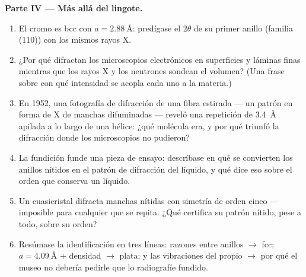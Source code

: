 \begin{problem}
\medskip\noindent\textbf{Parte IV --- Más allá del lingote.}

\begin{enumerate}[resume]
  \item El cromo es bcc con $a = \qty{2.88}{\angstrom}$: predígase
        el $2\theta$ de su primer anillo (familia (110)) con los
        mismos rayos X.
  \item ¿Por qué difractan los microscopios electrónicos en superficies y
        láminas finas mientras que los rayos X y los neutrones sondean el volumen? (Una
        frase sobre con qué intensidad se acopla cada uno a la materia.)
  \item En 1952, una fotografía de difracción de una fibra estirada --- un
        patrón en forma de X de manchas difuminadas --- reveló una repetición de
        \qty{3.4}{\angstrom} apilada a lo largo de una hélice: ¿qué molécula
        era, y por qué triunfó la difracción donde los microscopios no
        pudieron?
  \item La fundición funde una pieza de ensayo: descríbase en qué se convierten los
        anillos nítidos en el patrón de difracción del líquido, y qué
        dice eso sobre el orden que conserva un líquido.
  \item Un cuasicristal difracta manchas nítidas con simetría de orden
        cinco --- imposible para cualquier  que se repita. ¿Qué
        certifica su patrón nítido, pese a todo, sobre su orden?
  \item Resúmase la identificación en tres líneas: razones entre anillos
        $\to$ fcc; $a = \qty{4.09}{\angstrom}$ $+$ densidad $\to$
        plata; y las vibraciones del propio  $\to$ por qué el
        museo no debería pedirle que lo radiografíe fundido.
\end{enumerate}
\end{problem}
